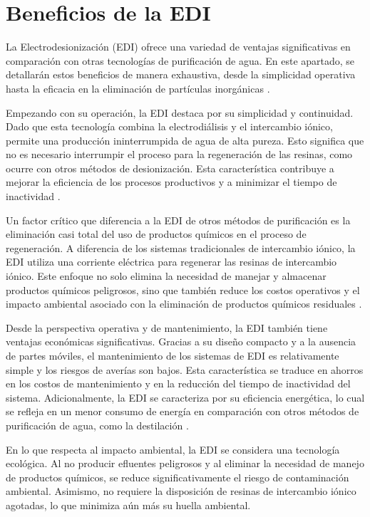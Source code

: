 \section{Beneficios de la EDI}
La Electrodesionización (EDI) ofrece una variedad de ventajas significativas en comparación con otras tecnologías de
purificación de agua. En este apartado, se detallarán estos beneficios de manera exhaustiva, desde la simplicidad operativa
hasta la eficacia en la eliminación de partículas inorgánicas \cite{condorchemUltrapureWaterElectrodeionization2019}.

Empezando con su operación, la EDI destaca por su simplicidad y continuidad. Dado que esta tecnología combina la electrodiálisis
y el intercambio iónico, permite una producción ininterrumpida de agua de alta pureza. Esto significa que no es necesario
interrumpir el proceso para la regeneración de las resinas, como ocurre con otros métodos de desionización. Esta característica
contribuye a mejorar la eficiencia de los procesos productivos y a minimizar el tiempo de inactividad \cite{lenntechElectrodeionizationEDI}.

Un factor crítico que diferencia a la EDI de otros métodos de purificación es la eliminación casi total del uso de productos
químicos en el proceso de regeneración. A diferencia de los sistemas tradicionales de intercambio iónico, la EDI utiliza una
corriente eléctrica para regenerar las resinas de intercambio iónico. Este enfoque no solo elimina la necesidad de manejar
y almacenar productos químicos peligrosos, sino que también reduce los costos operativos y el impacto ambiental asociado con
la eliminación de productos químicos residuales \cite{lenntechElectrodeionizationEDI}.

Desde la perspectiva operativa y de mantenimiento, la EDI también tiene ventajas económicas significativas. Gracias a su
diseño compacto y a la ausencia de partes móviles, el mantenimiento de los sistemas de EDI es relativamente simple y los
riesgos de averías son bajos. Esta característica se traduce en ahorros en los costos de mantenimiento y en la reducción
del tiempo de inactividad del sistema. Adicionalmente, la EDI se caracteriza por su eficiencia energética, lo cual se refleja
en un menor consumo de energía en comparación con otros métodos de purificación de agua, como la destilación \cite{lenntechElectrodeionizationEDI}.

En lo que respecta al impacto ambiental, la EDI se considera una tecnología ecológica. Al no producir efluentes peligrosos y
al eliminar la necesidad de manejo de productos químicos, se reduce significativamente el riesgo de contaminación ambiental.
Asimismo, no requiere la disposición de resinas de intercambio iónico agotadas, lo que minimiza aún más su huella ambiental.


